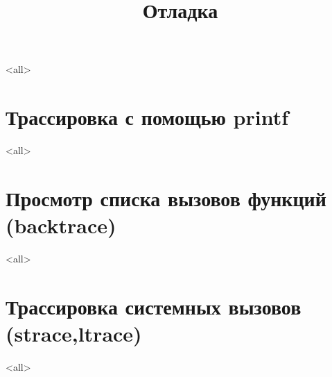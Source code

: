 

\title[Отладка]{Отладка}





\begin{frame}
	\frametitle{}
	\titlepage
	\vspace{-0.5cm}
	\begin{center}
	\end{center}
\end{frame}

\begin{frame}
	\tableofcontents
\end{frame}



\mode<all>{}

\section[printf]{Трассировка с помощью printf}

\mode<all>{}

\section[backtrace]{Просмотр списка вызовов функций (backtrace)}
\mode<all>{}

\section[strace]{Трассировка системных вызовов (strace,ltrace)}
\mode<all>{}


